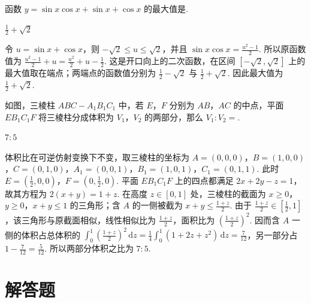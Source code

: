 \documentclass[UTF8,a4paper,oneside,11pt]{ctexbook}
\begin{document}
\begin{problem}
函数 \(y=\sin x\cos x+\sin x+\cos x\) 的最大值是\fillinblank{}.
\end{problem}

\begin{answer}
\(\frac{1}{2}+\sqrt{2}\)
\end{answer}

\begin{solution}
令 \(u=\sin x+\cos x\)，则 \(-\sqrt{2}\leqslant u\leqslant\sqrt{2}\)，并且 \(\sin x\cos x=\frac{u^2-1}{2}\). 所以原函数值为 \(\frac{u^2-1}{2}+u=\frac{u^2}{2}+u-\frac{1}{2}\). 这是开口向上的二次函数，在区间 \([-\sqrt{2},\sqrt{2}]\) 上的最大值取在端点；两端点的函数值分别为 \(\frac{1}{2}-\sqrt{2}\) 与 \(\frac{1}{2}+\sqrt{2}\). 因此最大值为 \(\frac{1}{2}+\sqrt{2}\).
\end{solution}

\begin{problem}
如图，三棱柱 \(ABC-A_1B_1C_1\) 中，若 \(E\)，\(F\) 分别为 \(AB\)，\(AC\) 的中点，平面 \(EB_1C_1F\) 将三棱柱分成体积为 \(V_1\)，\(V_2\) 的两部分，那么 \(V_1:V_2=\)\fillinblank{}.

\end{problem}

\begin{answer}
\(7:5\)
\end{answer}

\begin{solution}
体积比在可逆仿射变换下不变，取三棱柱的坐标为 \(A=(0,0,0)\)，\(B=(1,0,0)\)，\(C=(0,1,0)\)，\(A_1=(0,0,1)\)，\(B_1=(1,0,1)\)，\(C_1=(0,1,1)\). 此时 \(E=(\frac{1}{2},0,0)\)，\(F=(0,\frac{1}{2},0)\). 平面 \(EB_1C_1F\) 上的四点都满足 \(2x+2y-z=1\)，故其方程为 \(2(x+y)=1+z\). 在高度 \(z\in[0,1]\) 处，三棱柱的截面为 \(x\geqslant0\)，\(y\geqslant0\)，\(x+y\leqslant1\) 的三角形；含 \(A\) 的一侧被截为 \(x+y\leqslant\frac{1+z}{2}\). 由于 \(\frac{1+z}{2}\in[\frac12,1]\)，该三角形与原截面相似，线性相似比为 \(\frac{1+z}{2}\)，面积比为 \(\left(\frac{1+z}{2}\right)^2\). 因而含 \(A\) 一侧的体积占总体积的 \(\int_0^1\left(\frac{1+z}{2}\right)^2\,\mathrm dz=\frac{1}{4}\int_0^1(1+2z+z^2)\,\mathrm dz=\frac{7}{12}\)，另一部分占 \(1-\frac{7}{12}=\frac{5}{12}\). 所以两部分体积之比为 \(7:5\).
\end{solution}

\section{解答题}
\end{document}
